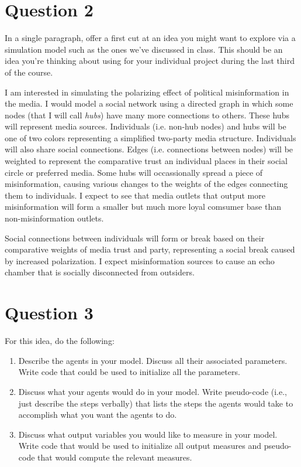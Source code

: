 \documentclass[titlepage, 12pt, leqno]{article}
\begin{document}
\pagebreak
\section{Question 2}

\begin{ex}
    In a single paragraph, offer a first cut at an idea you might want to explore 
    via a simulation model such as the ones we’ve discussed in class. This should
    be an idea you’re thinking about using for your individual project during the
    last third of the course.
\end{ex}

I am interested in simulating the polarizing effect of political misinformation in
the media. I would model a social network using a directed graph in which some
nodes (that I will call \textit{hubs}) have many more connections to others. These
hubs will represent media sources. Individuals (i.e. non-hub nodes) and hubs will
be one of two colors representing a simplified two-party media structure.
Individuals will also share social connections. Edges (i.e. connections between
nodes) will be weighted to represent the comparative trust an individual places in
their social circle or preferred media. Some hubs will occassionally spread a
piece of misinformation, causing various changes to the weights of the edges
connecting them to individuals. I expect to see that media outlets that output
more misinformation will form a smaller but much more loyal comsumer base than
non-misinformation outlets.

Social connections between individuals will form or break based on their
comparative weights of media trust and party, representing a social break caused
by increased polarization. I expect misinformation sources to cause an echo
chamber that is socially disconnected from outsiders.
 
\pagebreak
\section{Question 3}

\begin{ex}
    For this idea, do the following:
    \begin{enumerate}
        \item Describe the agents in your model. Discuss all their associated
            parameters. Write code that could be used to initialize all the 
            parameters.
        \item Discuss what your agents would do in your model. Write pseudo-code
            (i.e., just describe the steps verbally) that lists the steps the 
            agents would take to accomplish what you want the agents to do.
        \item Discuss what output variables you would like to measure in your 
            model. Write code that would be used to initialize all output 
            measures and pseudo-code that would compute the relevant measures.
    \end{enumerate}
\end{ex}
\end{document}

